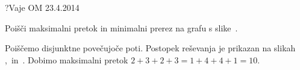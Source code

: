 \begin{naloga}{?}{Vaje OM 23.4.2014}
\begin{vprasanje}
Poišči maksimalni pretok in minimalni prerez na grafu s slike~\fig.

\begin{slika}
\pgfslika
{}
\end{slika}
\end{vprasanje}

\begin{odgovor}
Poiščemo disjunktne povečujoče poti.
Postopek reševanja je prikazan na slikah~%
,~ in~.
Dobimo maksimalni pretok $2+3+2+3 = 1+4+4+1 = 10$.

\begin{slika}
\end{slika}
\begin{slika}
\end{slika}
\begin{slika}
\end{slika}
\end{odgovor}
\end{naloga}
